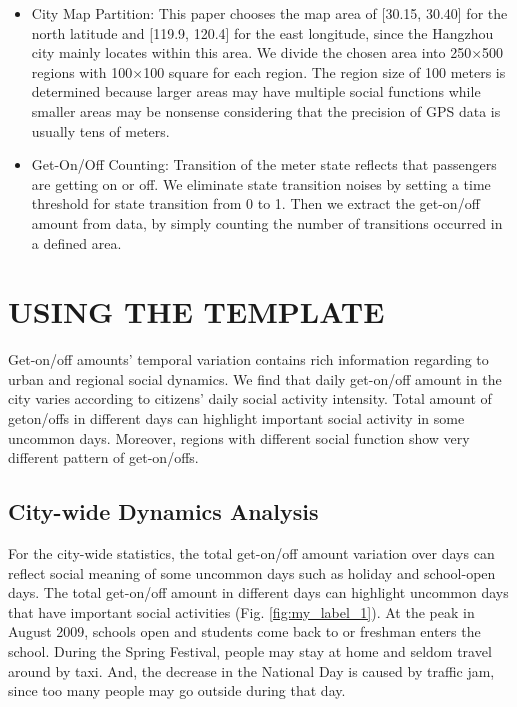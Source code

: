 \documentclass[a4paper, 10pt, conference]{ieeeconf}      %
\begin{document}
\begin{itemize}

\item City Map Partition: This paper chooses the map area of [30.15, 30.40] for the north latitude and [119.9, 120.4] for the east longitude, since the Hangzhou city mainly locates within this area. We divide the chosen area into 250×500 regions with 100×100 square for each region. The region size of 100 meters is determined because larger areas may have multiple social functions while smaller areas may be nonsense considering that the precision of GPS data is usually tens of meters.
\item Get-On/Off Counting: Transition of the meter state reflects that passengers are getting on or off. We eliminate state transition noises by setting a time threshold for state transition from 0 to 1. Then we extract the get-on/off amount from data, by simply counting the number of transitions occurred in a defined area.

\end{itemize}

\section{USING THE TEMPLATE}%

Get-on/off amounts’ temporal variation contains rich information regarding to urban and regional social dynamics. We find that daily get-on/off amount in the city varies according to citizens’ daily social activity intensity. Total amount of geton/offs in different days can highlight important social activity in some uncommon days. Moreover, regions with different social function show very different pattern of get-on/offs.

\subsection{City-wide Dynamics Analysis} For the city-wide statistics, the total get-on/off amount variation over days can reflect social meaning of some uncommon days such as holiday and school-open days.
The total get-on/off amount in different days can highlight uncommon days that have important social activities (Fig. \ref{fig:my_label_1}). At the peak in August 2009, schools open and students come back to or freshman enters the school. During the Spring Festival, people may stay at home and seldom travel around by taxi. And, the decrease in the National Day is caused by traffic jam, since too many people may go outside during that day.
\end{document}
